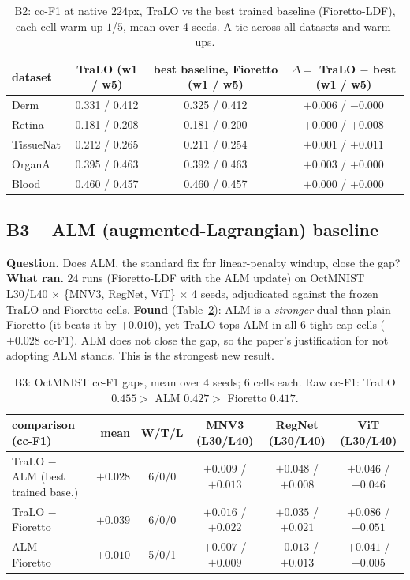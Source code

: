 \documentclass[11pt,a4paper]{article}
\begin{document}
\begin{table}[h]\centering\small
\begin{tabular}{lccc}
\toprule
dataset & TraLO (w1 / w5) & best baseline, Fioretto (w1 / w5) & $\Delta =$ TraLO $-$ best (w1 / w5) \\
\midrule
Derm      & 0.331 / 0.412 & 0.325 / 0.412 & $+0.006$ / $-0.000$ \\
Retina    & 0.181 / 0.208 & 0.181 / 0.200 & $+0.000$ / $+0.008$ \\
TissueNat & 0.212 / 0.265 & 0.211 / 0.254 & $+0.001$ / $+0.011$ \\
OrganA    & 0.395 / 0.463 & 0.392 / 0.463 & $+0.003$ / $+0.000$ \\
Blood     & 0.460 / 0.457 & 0.460 / 0.457 & $+0.000$ / $+0.000$ \\
\bottomrule
\end{tabular}
\caption{B2: cc-F1 at native $224$px, TraLO vs the best trained baseline (Fioretto-LDF), each cell warm-up
$1$/$5$, mean over 4 seeds. A tie across all datasets and warm-ups.}
\label{tab:b2}
\end{table}

\subsection{B3 -- ALM (augmented-Lagrangian) baseline}
\textbf{Question.} Does ALM, the standard fix for linear-penalty windup, close the gap? \textbf{What ran.} $24$
runs (Fioretto-LDF with the ALM update) on OctMNIST L30/L40 $\times$ \{MNV3, RegNet, ViT\} $\times$ 4 seeds,
adjudicated against the frozen TraLO and Fioretto cells. \textbf{Found} (Table~\ref{tab:b3}): ALM is a
\emph{stronger} dual than plain Fioretto (it beats it by $+0.010$), yet TraLO tops ALM in all $6$ tight-cap
cells ($+0.028$ cc-F1). ALM does not close the gap, so the paper's justification for not adopting ALM stands.
This is the strongest new result.

\begin{table}[h]\centering\small
\begin{tabular}{lrcccc}
\toprule
comparison (cc-F1) & mean & W/T/L & MNV3 (L30/L40) & RegNet (L30/L40) & ViT (L30/L40) \\
\midrule
TraLO $-$ ALM (best trained base.) & $+0.028$ & 6/0/0 & $+0.009$ / $+0.013$ & $+0.048$ / $+0.008$ & $+0.046$ / $+0.046$ \\
TraLO $-$ Fioretto & $+0.039$ & 6/0/0 & $+0.016$ / $+0.022$ & $+0.035$ / $+0.021$ & $+0.086$ / $+0.051$ \\
ALM $-$ Fioretto & $+0.010$ & 5/0/1 & $+0.007$ / $+0.009$ & $-0.013$ / $+0.013$ & $+0.041$ / $+0.005$ \\
\bottomrule
\end{tabular}
\caption{B3: OctMNIST cc-F1 gaps, mean over 4 seeds; $6$ cells each. Raw cc-F1: TraLO $0.455 >$ ALM $0.427 >$
Fioretto $0.417$.}
\label{tab:b3}
\end{table}
\end{document}
